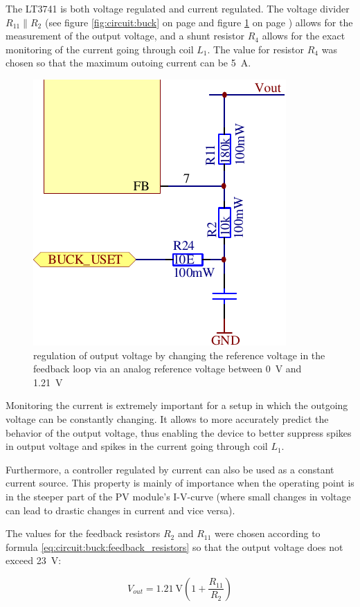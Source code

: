 The  LT3741  is both  voltage  regulated  and current  regulated. The  voltage
divider  $R_{11} \parallel  R_2$  (see figure  \ref{fig:circuit:buck} on  page
\pageref{fig:circuit:buck}  and  figure  \ref{fig:circuit:buck:uset}  on  page
\pageref{fig:circuit:buck:uset})  allows for  the  measurement  of the  output
voltage, and  a shunt resistor  $R_4$ allows for  the exact monitoring  of the
current going through  coil $L_1$. The value for resistor $R_4$  was chosen so
that the maximum outoing current can be \SI{5}{\ampere}.

\begin{figure}[th!]
    \center
    \includegraphics[width=.35\textwidth]{images/circuit/buck-uset.pdf}
    \caption{regulation of output voltage by changing the reference voltage in the feedback loop via an analog reference voltage between \SI{0}{\volt} and \SI{1.21}{\volt}}
    \label{fig:circuit:buck:uset}
\end{figure}

Monitoring  the current  is  extremely  important for  a  setup  in which  the
outgoing  voltage can  be constantly  changing. It allows  to more  accurately
predict the behavior of the output voltage, thus enabling the device to better
suppress spikes in output voltage and spikes in the current going through coil
$L_1$. %

Furthermore, a controller regulated by current  can also be used as a constant
current source. This property is mainly of importance when the operating point
is in  the steeper part  of the PV module's  I-V-curve (where small  changes in
voltage can lead to drastic changes in current and vice versa).

The values for the feedback resistors $R_2$ and $R_{11}$ were chosen according
to formula \ref{eq:circuit:buck:feedback_resistors} so that the output voltage
does not exceed \SI{23}{\volt}:

\begin{equation}
    V_{out} = \SI{1.21}{\volt} \left( 1 + \frac{R_{11}}{R_2} \right)
    \label{eq:circuit:buck:feedback_resistors}
\end{equation}

